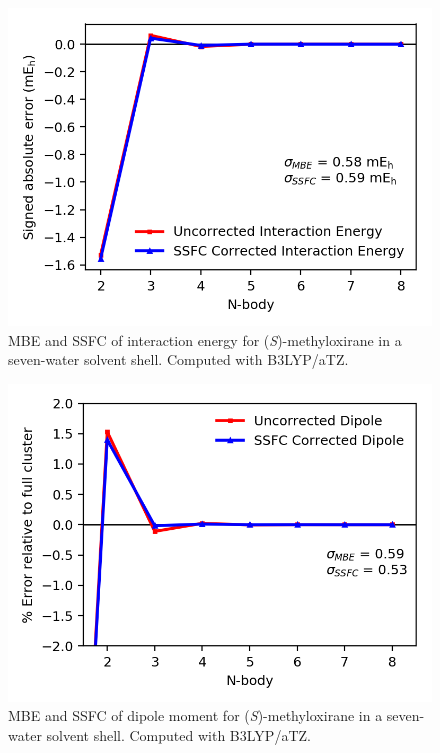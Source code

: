     \begin{figure}
        \centering
        \includegraphics[scale=0.75]{p1/graphs/si/metox_7_tz_int.png}
        \caption{MBE and SSFC of interaction energy for (\textit{S})-methyloxirane in a seven-water solvent shell. Computed with B3LYP/aTZ.}
        \label{metox_7_tz_int}
    \end{figure}
    \begin{figure}
        \centering
        \includegraphics[scale=0.75]{p1/graphs/si/metox_7_tz_dip.png}
        \caption{MBE and SSFC of dipole moment for (\textit{S})-methyloxirane in a seven-water solvent shell. Computed with B3LYP/aTZ.}
        \label{metox_7_tz_dip}
    \end{figure}

